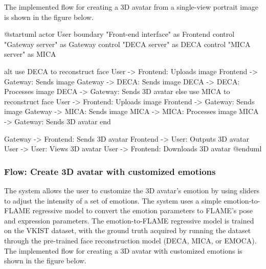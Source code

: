 The implemented flow for creating a 3D avatar from a single-view portrait image is shown in the figure below.

\begin{umlfigure}
    @startuml
    actor User
    boundary "Front-end interface" as Frontend
    control "Gateway server" as Gateway
    control "DECA server" as DECA
    control "MICA server" as MICA


    alt use DECA to reconstruct face
    User -> Frontend: Uploads image
    Frontend -> Gateway: Sends image
    Gateway -> DECA: Sends image
    DECA -> DECA: Processes image
    DECA -> Gateway: Sends 3D avatar
    else use MICA to reconstruct face
    User -> Frontend: Uploads image
    Frontend -> Gateway: Sends image
    Gateway -> MICA: Sends image
    MICA -> MICA: Processes image
    MICA -> Gateway: Sends 3D avatar
    end

    Gateway -> Frontend: Sends 3D avatar
    Frontend -> User: Outputs 3D avatar
    User -> User: Views 3D avatar
    User -> Frontend: Downloads 3D avatar
    @enduml
\end{umlfigure}


\subsubsection{Flow: Create 3D avatar with customized emotions}
The system allows the user to customize the 3D avatar's emotion by using sliders to adjust the intensity of a set of emotions. The system uses a simple emotion-to-FLAME regressive model to convert the emotion parameters to FLAME's pose and expression parameters. The emotion-to-FLAME regressive model is trained on the VKIST dataset, with the ground truth acquired by running the dataset through the pre-trained face reconstruction model (DECA, MICA, or EMOCA). The implemented flow for creating a 3D avatar with customized emotions is shown in the figure below.

